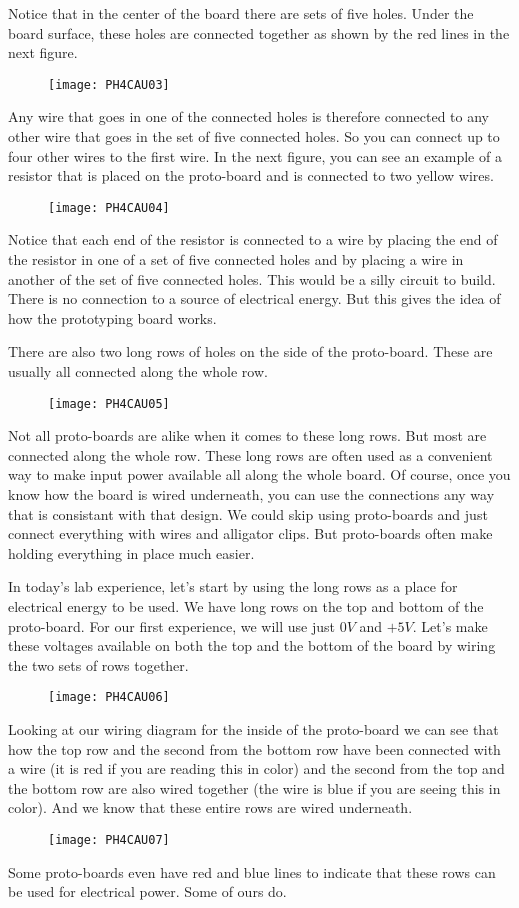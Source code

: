 Notice that in the center of the board there are sets of five holes. Under
the board surface, these holes are connected together as shown by the red
lines in the next figure. \begin{figure}[h!]
\texttt{[image: PH4CAU03]}
\end{figure} Any wire that goes in one of the
connected holes is therefore connected to any other wire that goes in the
set of five connected holes. So you can connect up to four other wires to
the first wire. In the next figure, you can see an example of a resistor
that is placed on the proto-board and is connected to two yellow wires. 
\begin{figure}[h!]
\texttt{[image: PH4CAU04]}
\end{figure}Notice that each end of the
resistor is connected to a wire by placing the end of the resistor in one of
a set of five connected holes and by placing a wire in another of the set of
five connected holes. This would be a silly circuit to build. There is no
connection to a source of electrical energy. But this gives the idea of how
the prototyping board works.

There are also two long rows of holes on the side of the proto-board. These
are usually all connected along the whole row. \begin{figure}[h!]
\texttt{[image: PH4CAU05]}
\end{figure}Not all proto-boards are alike
when it comes to these long rows. But most are connected along the whole
row. These long rows are often used as a convenient way to make input power
available all along the whole board. Of course, once you know how the board
is wired underneath, you can use the connections any way that is consistant
with that design. We could skip using proto-boards and just connect
everything with wires and alligator clips. But proto-boards often make
holding everything in place much easier.

In today's lab experience, let's start by using the long rows as a place for
electrical energy to be used. We have long rows on the top and bottom of the
proto-board. For our first experience, we will use just $0\unit{V}$ and $+5%
\unit{V}.$ Let's make these voltages available on both the top and the
bottom of the board by wiring the two sets of rows together. \begin{figure}[h!]
\texttt{[image: PH4CAU06]}
\end{figure}%
Looking at our wiring diagram for the inside of the proto-board we can see
that how the top row and the second from the bottom row have been connected
with a wire (it is red if you are reading this in color) and the second from
the top and the bottom row are also wired together (the wire is blue if you
are seeing this in color). And we know that these entire rows are wired
underneath. \begin{figure}[h!]
\texttt{[image: PH4CAU07]}
\end{figure}Some proto-boards even have red
and blue lines to indicate that these rows can be used for electrical power.
Some of ours do.

